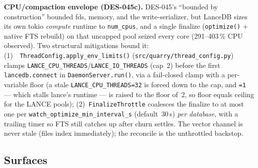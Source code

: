 \documentclass[a4paper,10pt]{article}
\newcommand{\modpath}[1]{\texttt{src/quarry/#1}}
\begin{document}
\textbf{CPU/compaction envelope (DES-045c).}  DES-045's ``bounded by
construction'' bounded fds, memory, and the write-serializer, but LanceDB sizes
its own tokio \emph{compute} runtime to \texttt{num\_cpus}, and a single finalize
(\texttt{optimize()} + native FTS rebuild) on that uncapped pool seized every
core (291--403\,\% CPU observed).  Two structural mitigations bound it: (1)~\
\texttt{ThreadConfig.apply\_env\_limits()} (\modpath{thread\_config.py}) clamps
\texttt{LANCE\_CPU\_THREADS}/\texttt{LANCE\_IO\_THREADS} (cap~2) before the first
\texttt{lancedb.connect} in \texttt{DaemonServer.run()}, via a fail-closed clamp
with a per-variable floor (a stale \texttt{LANCE\_CPU\_THREADS=32} is forced down
to the cap, and \texttt{=1} --- which stalls lance's runtime --- is raised to the
floor of~2, so floor equals ceiling for the LANCE pools); (2)~\texttt{FinalizeThrottle}
coalesces the finalize to at most one per \texttt{watch\_optimize\_min\_interval\_s}
(default~30\,s) \emph{per database}, with a trailing timer so FTS still catches
up after churn settles.  The vector channel is never stale (files index
immediately); the reconcile is the unthrottled backstop.

\subsection{Surfaces}
\end{document}
